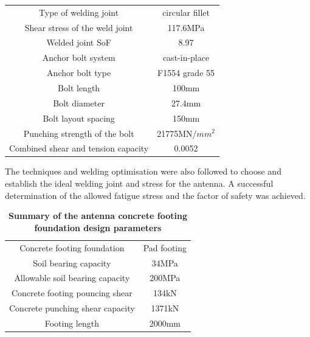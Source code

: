 {\begin{table}[h!]
\begin{tabular}{ c  c}
Type of welding joint & circular fillet\\

Shear stress of the weld joint & 117.6MPa\\

Welded joint SoF & 8.97\\

Anchor bolt system & cast-in-place\\

Anchor bolt type & F1554 grade 55\\

Bolt length & 100mm\\

Bolt diameter & 27.4mm\\

Bolt layout spacing & 150mm\\

Punching strength of the bolt & 21775MN/\(mm^2\)\\

Combined shear and tension capacity & 0.0052\\
\hline
 \end{tabular}
    \label{tab:3.7}
\end{table}

The techniques and welding optimisation were also followed to choose and establish the ideal welding joint and stress for the antenna. A successful determination of the allowed fatigue stress and the factor of safety was achieved.



 \begin{table}[h!]
    \centering
 
  \caption{\textbf{Summary of the antenna concrete footing foundation design parameters}}
\begin{tabular}{ c c }
    \hline
Concrete footing foundation & Pad footing\\ 

Soil bearing capacity & 34MPa \\

Allowable soil bearing capacity & 200MPa \\

Concrete footing pouncing shear & 134kN \\

Concrete punching shear capacity & 1371kN\\

Footing length & 2000mm\\


\end{tabular}
\end{table}}
